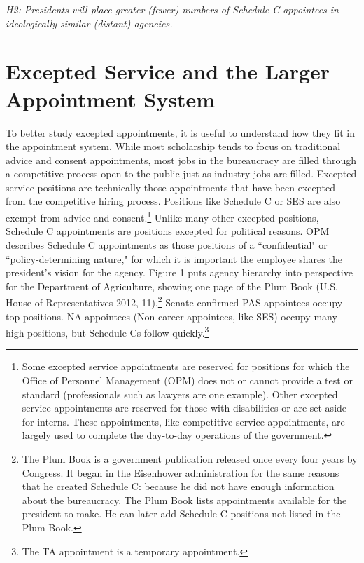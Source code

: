 \documentclass[12pt]{article}
\begin{document}
\textit{H2: Presidents will place greater (fewer) numbers of Schedule C appointees in ideologically similar (distant) agencies.}

\section*{Excepted Service and the Larger Appointment System}

	To better study excepted appointments, it is useful to understand how they fit in the appointment system. While most scholarship tends to focus on traditional advice and consent appointments, most jobs in the bureaucracy are filled through a competitive process open to the public just as industry jobs are filled. Excepted service positions are technically those appointments that have been excepted from the competitive hiring process. Positions like Schedule C or SES are also exempt from advice and consent.\footnote{Some excepted service appointments are reserved for positions for which the Office of Personnel Management (OPM) does not or cannot provide a test or standard (professionals such as lawyers are one example). Other excepted service appointments are reserved for those with disabilities or are set aside for interns. These appointments, like competitive service appointments, are largely used to complete the day-to-day operations of the government.}	Unlike many other excepted positions, Schedule C appointments are positions excepted for political reasons. OPM describes Schedule C appointments as those positions of a ``confidential" or ``policy-determining nature," for which it is important the employee shares the president's vision for the agency. Figure 1 puts agency hierarchy into perspective for the Department of Agriculture, showing one page of the Plum Book (U.S. House of Representatives 2012, 11).\footnote{The Plum Book is a government publication released once every four years by Congress. It began in the Eisenhower administration for the same reasons that he created Schedule C: because he did not have enough information about the bureaucracy. The Plum Book lists appointments available for the president to make. He can later add Schedule C positions not listed in the Plum Book.} Senate-confirmed PAS appointees occupy top positions. NA appointees (Non-career appointees, like SES) occupy many high positions, but Schedule Cs follow quickly.\footnote{The TA appointment is a temporary appointment.}
	
\end{document}
